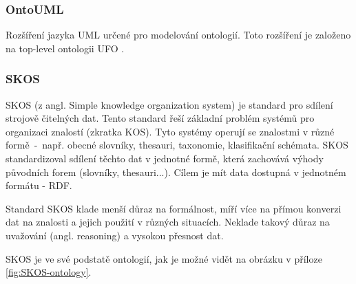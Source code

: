 \subsubsection{OntoUML}
Rozšíření jazyka UML určené pro modelování ontologií. Toto rozšíření je založeno na top-level ontologii UFO \cite{Guizzardi2005}.

\subsubsection{SKOS}
SKOS (z angl. Simple knowledge organization system) je standard pro sdílení strojově čitelných dat. Tento standard řeší základní problém systémů pro organizaci znalostí (zkratka KOS). Tyto systémy operují se znalostmi v různé formě~-~např. obecné slovníky, thesauri, taxonomie, klasifikační schémata. SKOS standardizoval sdílení těchto dat v jednotné formě, která zachovává výhody původních forem (slovníky, thesauri...). Cílem je mít data dostupná v jednotném formátu - RDF. \cite{SKOS}\par 
Standard SKOS klade menší důraz na formálnost, míří více na přímou konverzi dat na znalosti a jejich použití v různých situacích. Neklade takový důraz na uvažování (angl. reasoning) a vysokou přesnost dat. \cite{isaac2009skos}\par 
SKOS je ve své podstatě ontologií, jak je možné vidět na obrázku v příloze \ref{fig:SKOS-ontology}. 














